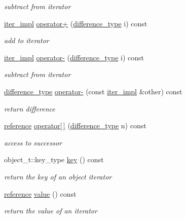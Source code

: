 \begin{DoxyCompactItemize}
\begin{DoxyCompactList}\small\item\em subtract from iterator \end{DoxyCompactList}\item 
\hyperlink{classnlohmann_1_1detail_1_1iter__impl}{iter\+\_\+impl} \hyperlink{classnlohmann_1_1detail_1_1iter__impl_afc5629527a820583cd009c411e30ac64}{operator+} (\hyperlink{classnlohmann_1_1detail_1_1iter__impl_a2f7ea9f7022850809c60fc3263775840}{difference\+\_\+type} i) const 
\begin{DoxyCompactList}\small\item\em add to iterator \end{DoxyCompactList}\item 
\hyperlink{classnlohmann_1_1detail_1_1iter__impl}{iter\+\_\+impl} \hyperlink{classnlohmann_1_1detail_1_1iter__impl_aa719903e6d509db51744cfca9c95fd8e}{operator-\/} (\hyperlink{classnlohmann_1_1detail_1_1iter__impl_a2f7ea9f7022850809c60fc3263775840}{difference\+\_\+type} i) const 
\begin{DoxyCompactList}\small\item\em subtract from iterator \end{DoxyCompactList}\item 
\hyperlink{classnlohmann_1_1detail_1_1iter__impl_a2f7ea9f7022850809c60fc3263775840}{difference\+\_\+type} \hyperlink{classnlohmann_1_1detail_1_1iter__impl_a327f3f6a97c6d0cdfc9fe232949d916b}{operator-\/} (const \hyperlink{classnlohmann_1_1detail_1_1iter__impl}{iter\+\_\+impl} \&other) const 
\begin{DoxyCompactList}\small\item\em return difference \end{DoxyCompactList}\item 
\hyperlink{classnlohmann_1_1detail_1_1iter__impl_a5be8001be099c6b82310f4d387b953ce}{reference} \hyperlink{classnlohmann_1_1detail_1_1iter__impl_ade15572ccb7c5b9c2541ecfd65252e99}{operator\mbox{[}$\,$\mbox{]}} (\hyperlink{classnlohmann_1_1detail_1_1iter__impl_a2f7ea9f7022850809c60fc3263775840}{difference\+\_\+type} n) const 
\begin{DoxyCompactList}\small\item\em access to successor \end{DoxyCompactList}\item 
object\+\_\+t\+::key\+\_\+type \hyperlink{classnlohmann_1_1detail_1_1iter__impl_aa2e9909148c4df211d89a0a8608e556c}{key} () const 
\begin{DoxyCompactList}\small\item\em return the key of an object iterator \end{DoxyCompactList}\item 
\hyperlink{classnlohmann_1_1detail_1_1iter__impl_a5be8001be099c6b82310f4d387b953ce}{reference} \hyperlink{classnlohmann_1_1detail_1_1iter__impl_adc4048d25e057ce8ec0b912642c24731}{value} () const 
\begin{DoxyCompactList}\small\item\em return the value of an iterator \end{DoxyCompactList}\end{DoxyCompactItemize}

